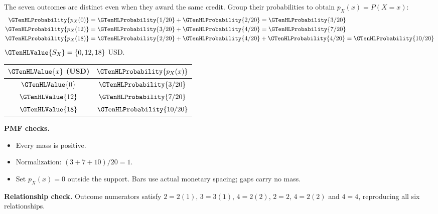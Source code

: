 The seven outcomes are distinct even when they award the same credit. Group their probabilities to obtain $p_X(x)=P(X=x)$:
\[\begin{aligned}
\GTenHLProbability{p_X(0)}&=\GTenHLProbability{1/20}+\GTenHLProbability{2/20}=\GTenHLProbability{3/20}\\
\GTenHLProbability{p_X(12)}&=\GTenHLProbability{3/20}+\GTenHLProbability{4/20}=\GTenHLProbability{7/20}\\
\GTenHLProbability{p_X(18)}&=\GTenHLProbability{2/20}+\GTenHLProbability{4/20}+\GTenHLProbability{4/20}=\GTenHLProbability{10/20}
\end{aligned}\]
$\GTenHLValue{S_X}=\{0,12,18\}$ USD.
\begin{center}\begin{minipage}{.26\linewidth}\centering
\begin{tabular}{cc}\toprule
$\GTenHLValue{x}$ (USD) & $\GTenHLProbability{p_X(x)}$\\
\midrule
$\GTenHLValue{0}$ & $\GTenHLProbability{3/20}$\\
$\GTenHLValue{12}$ & $\GTenHLProbability{7/20}$\\
$\GTenHLValue{18}$ & $\GTenHLProbability{10/20}$\\
\bottomrule\end{tabular}
\end{minipage}\hfill\begin{minipage}{.70\linewidth}\centering{}\end{minipage}\end{center}\textbf{PMF checks.}\begin{itemize}\item Every mass is positive.\item Normalization: $(3+7+10)/20=1$.\item Set $p_X(x)=0$ outside the support. Bars use actual monetary spacing; gaps carry no mass.\end{itemize}
\textbf{Relationship check.} Outcome numerators satisfy $2=2(1)$, $3=3(1)$, $4=2(2)$, $2=2$, $4=2(2)$ and $4=4$, reproducing all six relationships.

